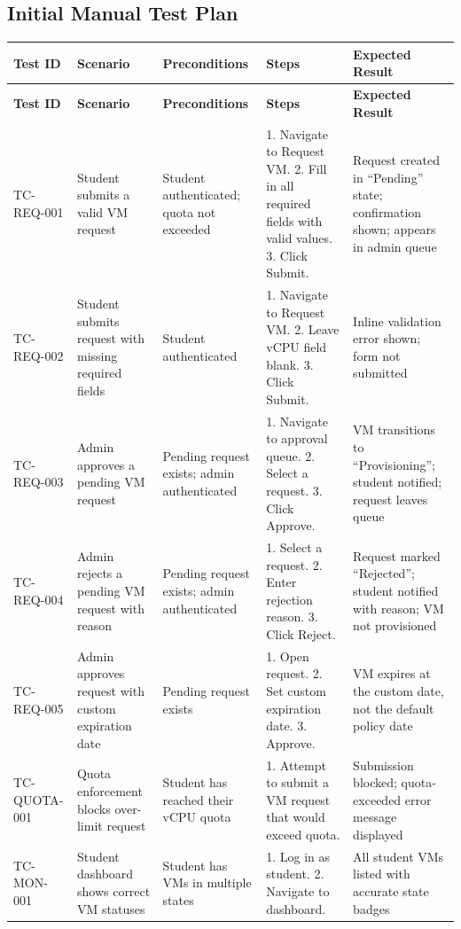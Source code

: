 \documentclass[12pt,letterpaper]{article}
\begin{document}
\subsection{Initial Manual Test Plan}

\begin{longtable}{L{2cm} L{3cm} L{3cm} L{3.5cm} L{3cm}}
  \toprule
  \textbf{Test ID} & \textbf{Scenario} & \textbf{Preconditions} & \textbf{Steps} & \textbf{Expected Result} \\
  \midrule
  \endfirsthead
  \toprule
  \textbf{Test ID} & \textbf{Scenario} & \textbf{Preconditions} & \textbf{Steps} & \textbf{Expected Result} \\
  \midrule
  \endhead
  \bottomrule
  \endfoot

  TC-REQ-001 & Student submits a valid VM request & Student authenticated; quota not exceeded & 1. Navigate to Request VM. 2. Fill in all required fields with valid values. 3. Click Submit. & Request created in ``Pending'' state; confirmation shown; appears in admin queue \\
  \addlinespace
  TC-REQ-002 & Student submits request with missing required fields & Student authenticated & 1. Navigate to Request VM. 2. Leave vCPU field blank. 3. Click Submit. & Inline validation error shown; form not submitted \\
  \addlinespace
  TC-REQ-003 & Admin approves a pending VM request & Pending request exists; admin authenticated & 1. Navigate to approval queue. 2. Select a request. 3. Click Approve. & VM transitions to ``Provisioning''; student notified; request leaves queue \\
  \addlinespace
  TC-REQ-004 & Admin rejects a pending VM request with reason & Pending request exists; admin authenticated & 1. Select a request. 2. Enter rejection reason. 3. Click Reject. & Request marked ``Rejected''; student notified with reason; VM not provisioned \\
  \addlinespace
  TC-REQ-005 & Admin approves request with custom expiration date & Pending request exists & 1. Open request. 2. Set custom expiration date. 3. Approve. & VM expires at the custom date, not the default policy date \\
  \addlinespace
  TC-QUOTA-001 & Quota enforcement blocks over-limit request & Student has reached their vCPU quota & 1. Attempt to submit a VM request that would exceed quota. & Submission blocked; quota-exceeded error message displayed \\
  \addlinespace
  TC-MON-001 & Student dashboard shows correct VM statuses & Student has VMs in multiple states & 1. Log in as student. 2. Navigate to dashboard. & All student VMs listed with accurate state badges \\

\end{longtable}
\end{document}
